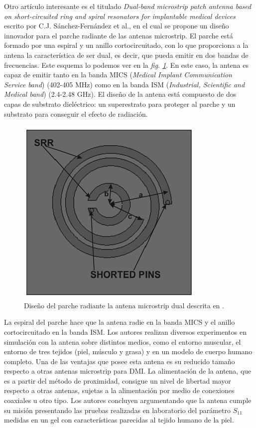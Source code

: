 Otro artículo interesante es el titulado \textit{Dual-band microstrip patch antenna based on short-circuited ring and spiral resonators for implantable medical devices}~\cite{requena} escrito por C.J. Sánchez-Fernández et al., en el cual se propone un diseño innovador para el parche radiante de las antenas microstrip. El parche está formado por una espiral y un anillo cortocircuitado, con lo que proporciona a la antena la característica de ser dual, es decir, que pueda emitir en dos bandas de frecuencias. Este esquema lo podemos ver en la \textit{fig. \ref{fig:fig2.12}}. En este caso, la antena es capaz de emitir tanto en la banda MICS (\textit{Medical Implant Communication Service band}) (402-405 MHz) como en la banda ISM (\textit{Industrial, Scientific and Medical band}) (2.4-2.48 GHz). El diseño de la antena está compuesto de dos capas de substrato dieléctrico: un superestrato para proteger al parche y un substrato para conseguir el efecto de radiación.

\begin{figure}[!htb]
    \centering
    \includegraphics[scale=0.4]{./ContextoTecnologico/articulos/requena1}
    \caption{Diseño del parche radiante la antena microstrip dual descrita en \cite{requena}.}
    \label{fig:fig2.12}
\end{figure}

La espiral del parche hace que la antena radie en la banda MICS y el anillo cortocircuitado en la banda ISM. Los autores realizan diversos experimentos en simulación con la antena sobre distintos medios, como el entorno muscular, el entorno de tres tejidos (piel, músculo y grasa) y en un modelo de cuerpo humano completo. Una de las ventajas que posee esta antena es su reducido tamaño respecto a otras antenas microstrip para DMI. La alimentación de la antena, que es a partir del método de proximidad, consigue un nivel de libertad mayor respecto a otras antenas, sujetas a la alimentación por medio de conexiones coaxiales u otro tipo. Los autores concluyen argumentando que la antena cumple su misión presentando las pruebas realizadas en laboratorio del parámetro $S_{11}$ medidas en un gel con características parecidas al tejido humano de la piel.\\


